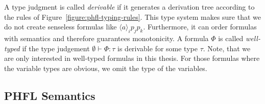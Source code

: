 A type judgment is called \textit{derivable} if it generates a derivation tree according to the rules of
Figure~\ref{figure:phfl-typing-rules}. This type system makes sure that we do not create senseless formulas like
$\langle a \rangle_i p_j p_k$. Furthermore, it can order formulas with semantics and therefore guarantees monotonicity. A
formula $\Phi$ is called \textit{well-typed} if the type judgement $\emptyset \vdash \Phi:\tau$ is derivable for some
type $\tau$. Note, that we are only interested in well-typed formulas in this thesis. For those formulas where the variable
types are obvious, we omit the type of the variables.

\subsection{PHFL Semantics}\label{subsec:phflSemantics}


